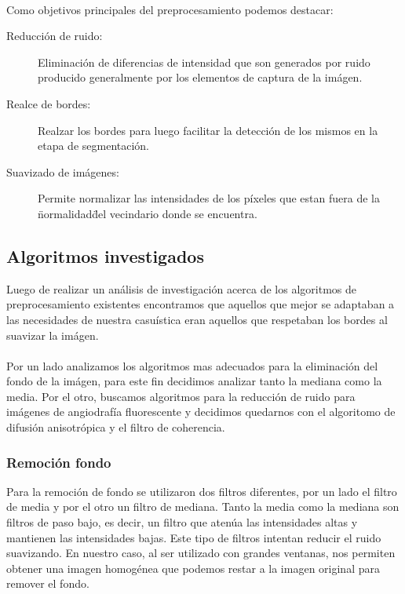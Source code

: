 \paragraph{}
Como objetivos principales del preprocesamiento podemos destacar:
\begin{description}
  \item[Reducci\'on de ruido:] Eliminaci\'on de diferencias de intensidad que son generados por ruido producido generalmente por los elementos de captura de la im\'agen.
  \item[Realce de bordes:] Realzar los bordes para luego facilitar la detecci\'on de los mismos en la etapa de segmentaci\'on.
  \item[Suavizado de im\'agenes:] Permite normalizar las intensidades de los p\'ixeles que estan fuera de la \"normalidad\" del vecindario donde se encuentra.
\end{description}

\subsection{Algoritmos investigados}

Luego de realizar un an\'alisis de investigaci\'on acerca de los algoritmos de preprocesamiento existentes encontramos que aquellos que mejor se adaptaban a las necesidades de nuestra casu\'istica eran aquellos que respetaban los bordes al suavizar la im\'agen.
\paragraph{}
Por un lado analizamos los algoritmos mas adecuados para la eliminaci\'on del fondo de la im\'agen, para este fin decidimos analizar tanto la mediana como la media. Por el otro, buscamos algoritmos para la reducci\'on de ruido para im\'agenes de angiodraf\'ia fluorescente y decidimos quedarnos con el algoritomo de difusi\'on anisotr\'opica y el filtro de coherencia.

\subsubsection{Remoci\'on fondo}

Para la remoci\'on de fondo se utilizaron dos filtros diferentes, por un lado el filtro de media y por el otro un filtro de mediana. Tanto la media como la mediana son filtros de paso bajo, es decir, un filtro que aten\'ua las intensidades altas y mantienen las intensidades bajas. Este tipo de filtros intentan reducir el ruido suavizando. En nuestro caso, al ser utilizado con grandes ventanas, nos permiten obtener una imagen homogénea que podemos restar a la imagen original para remover el fondo.

